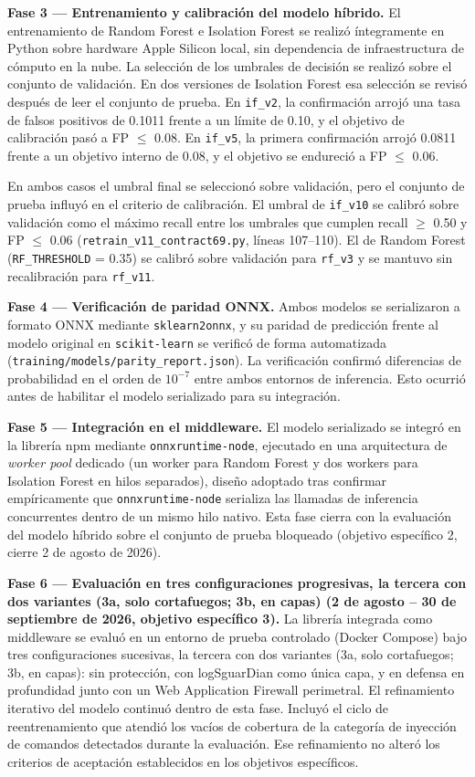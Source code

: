\textbf{Fase 3 --- Entrenamiento y calibración del modelo híbrido.} El entrenamiento de Random Forest e Isolation Forest se realizó íntegramente en Python sobre hardware Apple Silicon local, sin dependencia de infraestructura de cómputo en la nube. La selección de los umbrales de decisión se realizó sobre el conjunto de validación. En dos versiones de Isolation Forest esa selección se revisó después de leer el conjunto de prueba. En \texttt{if\_v2}, la confirmación arrojó una tasa de falsos positivos de 0.1011 frente a un límite de 0.10, y el objetivo de calibración pasó a FP $\leq$ 0.08. En \texttt{if\_v5}, la primera confirmación arrojó 0.0811 frente a un objetivo interno de 0.08, y el objetivo se endureció a FP $\leq$ 0.06.

En ambos casos el umbral final se seleccionó sobre validación, pero el conjunto de prueba influyó en el criterio de calibración. El umbral de \texttt{if\_v10} se calibró sobre validación como el máximo recall entre los umbrales que cumplen recall $\geq$ 0.50 y FP $\leq$ 0.06 (\texttt{retrain\_v11\_contract69.py}, líneas 107--110). El de Random Forest (\texttt{RF\_THRESHOLD} = 0.35) se calibró sobre validación para \texttt{rf\_v3} y se mantuvo sin recalibración para \texttt{rf\_v11}.

\textbf{Fase 4 --- Verificación de paridad ONNX.} Ambos modelos se serializaron a formato ONNX mediante \texttt{sklearn2onnx}, y su paridad de predicción frente al modelo original en \texttt{scikit-learn} \parencite{pedregosa2011} se verificó de forma automatizada (\texttt{training/models/parity\_report.json}). La verificación confirmó diferencias de probabilidad en el orden de $10^{-7}$ entre ambos entornos de inferencia. Esto ocurrió antes de habilitar el modelo serializado para su integración.

\textbf{Fase 5 --- Integración en el middleware.} El modelo serializado se integró en la librería npm mediante \texttt{onnxruntime-node}, ejecutado en una arquitectura de \textit{worker pool} dedicado (un worker para Random Forest y dos workers para Isolation Forest en hilos separados), diseño adoptado tras confirmar empíricamente que \texttt{onnxruntime-node} serializa las llamadas de inferencia concurrentes dentro de un mismo hilo nativo. Esta fase cierra con la evaluación del modelo híbrido sobre el conjunto de prueba bloqueado (objetivo específico 2, cierre 2 de agosto de 2026).

\textbf{Fase 6 --- Evaluación en tres configuraciones progresivas, la tercera con dos variantes (3a, solo cortafuegos; 3b, en capas) (2 de agosto -- 30 de septiembre de 2026, objetivo específico 3).} La librería integrada como middleware se evaluó en un entorno de prueba controlado (Docker Compose) bajo tres configuraciones sucesivas, la tercera con dos variantes (3a, solo cortafuegos; 3b, en capas): sin protección, con logSguarDian como única capa, y en defensa en profundidad junto con un Web Application Firewall perimetral. El refinamiento iterativo del modelo continuó dentro de esta fase. Incluyó el ciclo de reentrenamiento que atendió los vacíos de cobertura de la categoría de inyección de comandos detectados durante la evaluación. Ese refinamiento no alteró los criterios de aceptación establecidos en los objetivos específicos.

